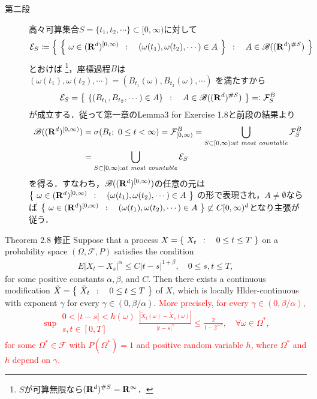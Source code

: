 \begin{prf}
\begin{description}
			\item[第二段]
				高々可算集合$S = \{t_1,t_2,\cdots\} \subset [0,\infty)$に対して
				\begin{align}
					\mathcal{E}_S \coloneqq \left\{\ \left\{\ \omega \in (\mathbf{R}^d)^{[0,\infty)}\ \, : \quad (\omega(t_1),\omega(t_2),\cdots) \in A\ \right\}\ \, : \quad A \in \mathscr{B}((\mathbf{R}^d)^{\# S})\ \right\}
				\end{align}
				とおけば
				\footnote{
					$S$が可算無限なら$(\mathbf{R}^d)^{\# S} = \mathbf{R}^\infty$．
				}，座標過程$B$は
				$(\omega(t_1),\omega(t_2),\cdots) = (B_{t_1}(\omega),B_{t_2}(\omega),\cdots)$
				を満たすから
				\begin{align}
					\mathcal{E}_S = \left\{\ \left\{(B_{t_1},B_{t_2},\cdots) \in A\right\}\ \, : \quad A \in \mathscr{B}((\mathbf{R}^d)^{\# S})\ \right\} =\mathrel{\mathop:} \mathcal{F}^B_S
				\end{align}
				が成立する．従って第一章のLemma3 for Exercise 1.8と前段の結果より
				\begin{align}
					\borel{(\R^d)^{[0,\infty)}}
					&= \sigma(B_t;\ 0 \leq t < \infty)
					= \mathcal{F}^B_{[0,\infty)}
					= \bigcup_{S \subset [0,\infty):at\ most\ countable} \mathcal{F}^B_S\\
					&= \bigcup_{S \subset [0,\infty):at\ most\ countable} \mathcal{E}_S
				\end{align}
				を得る．すなわち，$\mathscr{B}((\mathbf{R}^d)^{[0,\infty)})$の任意の元は
				$\left\{\ \omega \in (\mathbf{R}^d)^{[0,\infty)}\ \, : \quad (\omega(t_1),\omega(t_2),\cdots) \in A\ \right\}$
				の形で表現され，$A \neq \emptyset$ならば
				$\left\{\ \omega \in (\mathbf{R}^d)^{[0,\infty)}\ \, : \quad (\omega(t_1),\omega(t_2),\cdots) \in A\ \right\} \not\subset C[0,\infty)^d$となり主張が従う．
				\QED
		\end{description}
	\end{prf}
	
	\begin{itembox}[l]{Theorem 2.8 修正}
		Suppose that a process $X = \left\{\ X_t\ \, : \quad 0 \leq t \leq T\ \right\}$ on a probability space 
		$(\Omega,\mathscr{F},P)$ satisfies the condition
		\begin{align}
			E|X_t - X_s|^\alpha \leq C|t-s|^{1 + \beta},
			\quad 0 \leq s,t \leq T,
		\end{align}
		for some positive constants $\alpha,\beta$, and $C$. Then there exists a 
		continuous modification $\tilde{X} = \left\{\ \tilde{X}_t\ \, : \quad 0 \leq t \leq T\ \right\}$ of $X$, 
		which is locally Hlder-continuous with exponent $\gamma$ for every 
		$\gamma \in (0,\beta/\alpha)$. \textcolor{red}{More precisely, for every $\gamma \in (0,\beta/\alpha)$,
		\begin{align}
			\sup{\substack{0 < |t-s| < h(\omega) \\ s,t \in [0,T]}}{\frac{\left| \tilde{X}_t(\omega) - \tilde{X}_s(\omega) \right|}{|t-s|^\gamma}} \leq \frac{2}{1-2^{-\gamma}},
			\quad \forall \omega \in \Omega^*,
		\end{align}
		for some $\Omega^* \in \mathscr{F}$ with $P(\Omega^*)=1$ and 
		positive random variable $h$, where $\Omega^*$ and $h$ depend on $\gamma$.}
	\end{itembox}
	
